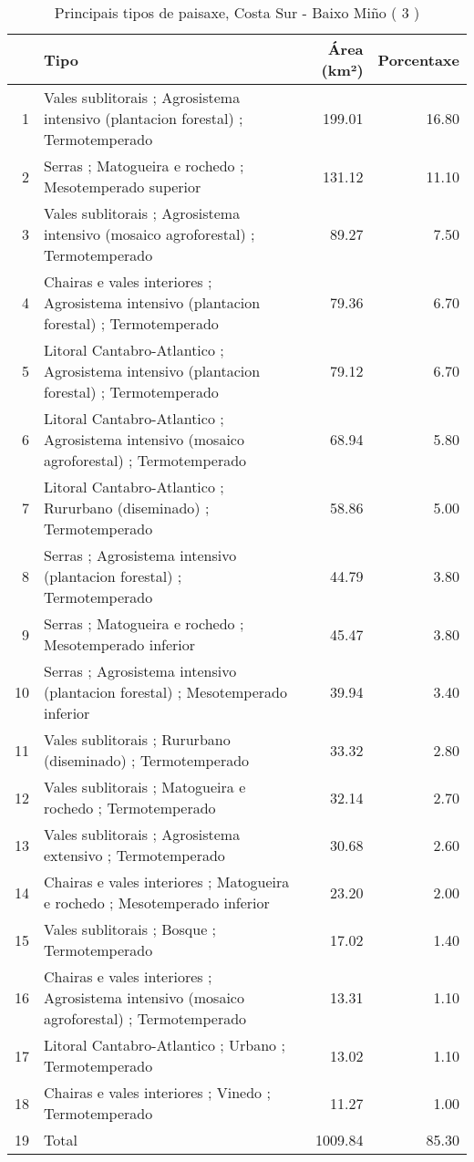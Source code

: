 \begin{table}[p]
\centering
\caption{Principais tipos de paisaxe,  Costa Sur - Baixo Miño ( 3 )} 
\label{Tipos 3}
\begin{tabular}{rlrr}
  \hline
 & Tipo & Área (km²) & Porcentaxe \\ 
  \hline
1 & Vales sublitorais ; Agrosistema intensivo (plantacion forestal) ; Termotemperado & 199.01 & 16.80 \\ 
  2 & Serras ; Matogueira e rochedo ; Mesotemperado superior & 131.12 & 11.10 \\ 
  3 & Vales sublitorais ; Agrosistema intensivo (mosaico agroforestal) ; Termotemperado & 89.27 & 7.50 \\ 
  4 & Chairas e vales interiores ; Agrosistema intensivo (plantacion forestal) ; Termotemperado & 79.36 & 6.70 \\ 
  5 & Litoral Cantabro-Atlantico ; Agrosistema intensivo (plantacion forestal) ; Termotemperado & 79.12 & 6.70 \\ 
  6 & Litoral Cantabro-Atlantico ; Agrosistema intensivo (mosaico agroforestal) ; Termotemperado & 68.94 & 5.80 \\ 
  7 & Litoral Cantabro-Atlantico ; Rururbano (diseminado) ; Termotemperado & 58.86 & 5.00 \\ 
  8 & Serras ; Agrosistema intensivo (plantacion forestal) ; Termotemperado & 44.79 & 3.80 \\ 
  9 & Serras ; Matogueira e rochedo ; Mesotemperado inferior & 45.47 & 3.80 \\ 
  10 & Serras ; Agrosistema intensivo (plantacion forestal) ; Mesotemperado inferior & 39.94 & 3.40 \\ 
  11 & Vales sublitorais ; Rururbano (diseminado) ; Termotemperado & 33.32 & 2.80 \\ 
  12 & Vales sublitorais ; Matogueira e rochedo ; Termotemperado & 32.14 & 2.70 \\ 
  13 & Vales sublitorais ; Agrosistema extensivo ; Termotemperado & 30.68 & 2.60 \\ 
  14 & Chairas e vales interiores ; Matogueira e rochedo ; Mesotemperado inferior & 23.20 & 2.00 \\ 
  15 & Vales sublitorais ; Bosque ; Termotemperado & 17.02 & 1.40 \\ 
  16 & Chairas e vales interiores ; Agrosistema intensivo (mosaico agroforestal) ; Termotemperado & 13.31 & 1.10 \\ 
  17 & Litoral Cantabro-Atlantico ; Urbano ; Termotemperado & 13.02 & 1.10 \\ 
  18 & Chairas e vales interiores ; Vinedo ; Termotemperado & 11.27 & 1.00 \\ 
  19 & Total & 1009.84 & 85.30 \\ 
   \hline
\end{tabular}
\end{table}
